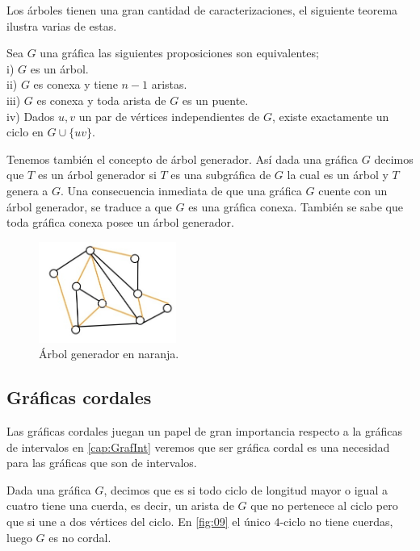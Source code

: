Los árboles tienen una gran cantidad de caracterizaciones, el siguiente teorema
ilustra varias de estas.

\begin{teorema}
\label{teo:101}
    Sea $G$ una gráfica las siguientes proposiciones son equivalentes;\\
    i) $G$ es un árbol.\\
    ii) $G$ es conexa y tiene $n-1$ aristas.\\
    iii) $G$ es conexa y toda arista de $G$ es un puente.\\
    iv) Dados $u,v$ un par de vértices independientes de $G$, existe exactamente
    un ciclo en $G\cup \{uv\}$.
\end{teorema}

Tenemos también el concepto de árbol generador. Así dada una gráfica $G$ decimos
que $T$ es un árbol generador si $T$ es una subgráfica de $G$ la cual es un
árbol y $T$ genera a $G$. Una consecuencia inmediata de que una gráfica $G$
cuente con un árbol generador, se traduce a que $G$ es una gráfica conexa.
También se sabe que toda gráfica conexa posee un árbol generador.

\begin{figure}[H]
  \centering
  \includegraphics[width=0.4\textwidth]{recursos/capturas/17.jpg}
  \caption{Árbol generador en naranja.}
  \label{fig:15}
\end{figure}


\subsection{Gr\'aficas cordales}
Las gráficas cordales juegan un papel de gran importancia respecto a la gráficas
de intervalos en \cref{cap:GrafInt} veremos que ser gráfica cordal es una
necesidad para las gráficas que son de intervalos. 

Dada una gráfica $G$, decimos que es  si todo ciclo
de longitud mayor o igual a cuatro tiene una cuerda, es decir, un arista de $G$
que no pertenece al ciclo pero que si une a dos vértices del ciclo. En
\cref{fig:09} el único $4$-ciclo no tiene cuerdas, luego $G$ es no cordal.

